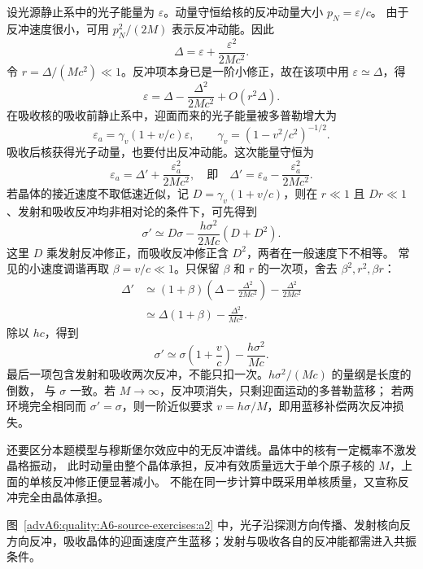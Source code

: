 \begin{advsolution}
设光源静止系中的光子能量为 $\varepsilon$。动量守恒给核的反冲动量大小 $p_N=\varepsilon/c$。
由于反冲速度很小，可用 $p_N^2/(2M)$ 表示反冲动能。因此
\[
 \Delta=\varepsilon+\frac{\varepsilon^2}{2Mc^2}.
\]
令 $r=\Delta/(Mc^2)\ll1$。反冲项本身已是一阶小修正，故在该项中用 $\varepsilon\simeq\Delta$，得
\[
 \varepsilon=\Delta-\frac{\Delta^2}{2Mc^2}+O(r^2\Delta).
\]
在吸收核的吸收前静止系中，迎面而来的光子能量被多普勒增大为
\[
 \varepsilon_a=\gamma_v(1+v/c)\varepsilon,
 \qquad \gamma_v=(1-v^2/c^2)^{-1/2}.
\]
吸收后核获得光子动量，也要付出反冲动能。这次能量守恒为
\[
 \varepsilon_a=\Delta'+\frac{\varepsilon_a^2}{2Mc^2},
 \quad\text{即}\quad
 \Delta'=\varepsilon_a-\frac{\varepsilon_a^2}{2Mc^2}.
\]
若晶体的接近速度不取低速近似，记 $D=\gamma_v(1+v/c)$，则在
$r\ll1$ 且 $Dr\ll1$、发射和吸收反冲均非相对论的条件下，可先得到
\[
 \boxed{\sigma'\simeq D\sigma-\frac{h\sigma^2}{2Mc}(D+D^2)}.
\]
这里 $D$ 乘发射反冲修正，而吸收反冲修正含 $D^2$，两者在一般速度下不相等。
常见的小速度调谐再取 $\beta=v/c\ll1$。只保留 $\beta$ 和 $r$ 的一次项，舍去 $\beta^2,r^2,\beta r$：
\begin{align*}
 \Delta'
 &\simeq(1+\beta)\left(\Delta-\frac{\Delta^2}{2Mc^2}\right)
     -\frac{\Delta^2}{2Mc^2}\\
 &\simeq\Delta(1+\beta)-\frac{\Delta^2}{Mc^2}.
\end{align*}
除以 $hc$，得到
\[
 \boxed{\sigma'\simeq\sigma\left(1+\frac vc\right)-\frac{h\sigma^2}{Mc}}.
\]
最后一项包含发射和吸收两次反冲，不能只扣一次。$h\sigma^2/(Mc)$ 的量纲是长度的倒数，
与 $\sigma$ 一致。若 $M\to\infty$，反冲项消失，只剩迎面运动的多普勒蓝移；
若两环境完全相同而 $\sigma'=\sigma$，则一阶近似要求 $v=h\sigma/M$，即用蓝移补偿两次反冲损失。

还要区分本题模型与穆斯堡尔效应中的无反冲谱线。晶体中的核有一定概率不激发晶格振动，
此时动量由整个晶体承担，反冲有效质量远大于单个原子核的 $M$，上面的单核反冲修正便显著减小。
不能在同一步计算中既采用单核质量，又宣称反冲完全由晶体承担。

图~\ref{advA6:quality:A6-source-exercises:a2} 中，光子沿探测方向传播、发射核向反方向反冲，吸收晶体的迎面速度产生蓝移；发射与吸收各自的反冲能都需进入共振条件。
\end{advsolution}

